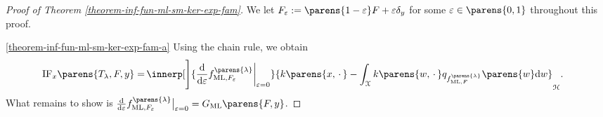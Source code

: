 \begin{proof}[Proof of Theorem \ref{theorem-inf-fun-ml-sm-ker-exp-fam}]
	
	We let $F_{\varepsilon} := \parens{1 - \varepsilon} F + \varepsilon \delta_y$ for some $\varepsilon \in \parens{0, 1}$ throughout this proof. 
	
	\ref{theorem-inf-fun-ml-sm-ker-exp-fam-a} Using the chain rule, we obtain 
	\begin{align*}
		\mathrm{IF}_x \parens{T_{\lambda}, F, y} = & \, \innerp[\Bigg]{ \frac{\diff}{\diff \varepsilon} f_{\ML, F_{\varepsilon}}^{\parens{\lambda}} \bigg\vert_{\varepsilon = 0}}{ k \parens{x, \,\cdot\,} - \int_{\calX} k \parens{w, \,\cdot\,} q_{f_{\ML, F}^{\parens{\lambda}}} \parens{w} \diff w }_{\calH}. 
	\end{align*}
	What remains to show is $\frac{\diff}{\diff \varepsilon} f_{\ML, F_{\varepsilon}}^{\parens{\lambda}} \big\vert_{\varepsilon = 0} = G_{\ML} \parens{F, y}$. 
	

\end{proof}

